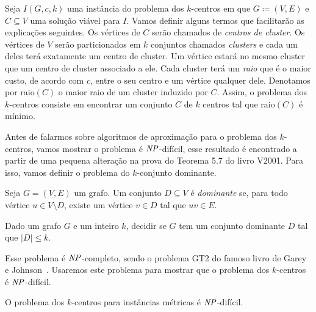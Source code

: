 Seja $I(G,c,k)$ uma instância do problema dos $k$-centros em que $G\coloneqq (V,E)$ e $C \subseteq V$ uma solução viável para $I$. Vamos definir alguns termos que facilitarão as explicações seguintes. Os vértices de $C$ serão chamados de \emph{centros de cluster}. Os vértices de $V$ serão particionados em $k$ conjuntos chamados \emph{clusters} e cada um deles terá exatamente um centro de cluster. Um vértice estará no mesmo cluster que um centro de cluster associado a ele. Cada cluster terá um \emph{raio} que é o maior custo, de acordo com $c$, entre o seu centro e um vértice qualquer dele. Denotamos por raio$(C)$ o maior raio de um cluster induzido por $C$. Assim, o problema dos $k$-centros consiste em encontrar um conjunto $C$ de $k$ centros tal que raio$(C)$ é mínimo.

Antes de falarmos sobre algoritmos de aproximação para o problema dos $k$-centros, vamos mostrar o problema é $\mathit{NP}$-difícil, esse resultado é encontrado a partir de uma pequena alteração na prova do Teorema 5.7 do livro V2001. Para isso, vamos definir o problema do $k$-conjunto dominante.

\begin{definition}
    Seja $G = (V,E)$ um grafo. Um conjunto $D \subseteq V$ é \emph{dominante} se, para todo vértice $u \in V \setminus D$, existe um vértice $v \in D$ tal que $uv \in E$.
\end{definition}

\begin{problem}
    Dado um grafo $G$ e um inteiro $k$, decidir se $G$ tem um conjunto dominante $D$ tal que $|D| \leq k$.      
\end{problem}
Esse problema é $\mathit{NP}$-completo, sendo o problema GT2 do famoso livro de Garey e Johnson~\cite{garey1979computers}. Usaremos este problema para mostrar que o problema dos $k$-centros é $\mathit{NP}$-difícil.

\begin{theorem}\label{theorem:2.3}
    O problema dos $k$-centros para instâncias métricas é $\mathit{NP}$-difícil.
\end{theorem}

